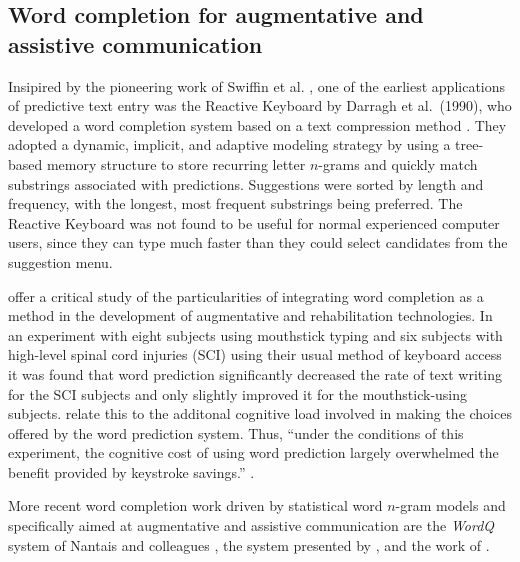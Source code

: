 \documentclass[12pt]{article}
\begin{document}

\subsection{Word completion for augmentative and assistive communication}

Insipired by the pioneering work of Swiffin et al. \citeyear{Swiffin+85}, one of the earliest applications of predictive text entry was the Reactive Keyboard by Darragh et al.~(1990), who developed a word completion system based on a text compression method \cite{Darragh+90}. They adopted a dynamic, implicit, and adaptive modeling strategy by using a tree-based memory structure to store recurring letter $n$-grams and quickly match substrings associated with predictions. Suggestions were sorted by length and frequency, with the longest, most frequent substrings being preferred. The Reactive Keyboard was not found to be useful for normal experienced computer users, since they can type much faster than they could select candidates from the suggestion menu. 

 offer a critical study of the particularities of integrating word completion as a method in the development of augmentative and rehabilitation technologies. In an experiment with eight subjects using mouthstick typing and six subjects with high-level spinal cord injuries (SCI) using their usual method of keyboard access it was found that word prediction significantly decreased the rate of text writing for the SCI subjects and only slightly improved it for the mouthstick-using subjects.  relate this to the additonal cognitive load involved in making the choices offered by the word prediction system. Thus, ``under the conditions of this experiment, the cognitive cost of using word prediction largely overwhelmed the benefit provided by keystroke savings.'' \cite{Horstmann-Koester+96}.

More recent word completion work driven by statistical word $n$-gram models and specifically aimed at augmentative and assistive communication are the {\it WordQ}\/ system of Nantais and colleagues \cite{Nantais+01,Shein+01}, the system presented by , and the work of .
\end{document}
